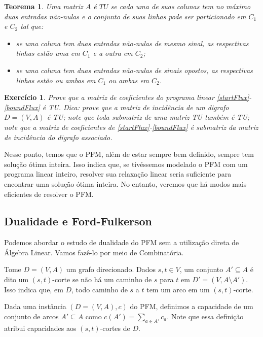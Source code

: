 \documentclass[]{article}
\newtheorem{teorema}{Teorema}
\newtheorem{exercicio}{Exercício}
\numberwithin{equation}{section}
\begin{document}
\begin{teorema}
  Uma matriz $A$ é $TU$ se cada uma de suas colunas tem no máximo duas entradas não-nulas e o conjunto
  de suas linhas pode ser particionado em $C_1$ e $C_2$ tal que:
  \begin{itemize}
    \item se uma coluna tem duas entradas não-nulas de mesmo sinal, as respectivas linhas estão uma em
          $C_1$ e a outra em $C_2$;
    \item se uma coluna tem duas entradas não-nulas de sinais opostos, as respectivas linhas estão ou
          ambas em $C_1$ ou ambas em $C_2$.
  \end{itemize}
\end{teorema}

\begin{exercicio}
  Prove que a matriz de coeficientes do programa linear \eqref{startFlux}-\eqref{boundFlux} é TU.
  Dica: prove que a matriz de incidência de um digrafo $D = (V, A)$ é TU; note que toda submatriz de uma
  matriz TU também é TU; note que a matriz de coeficientes de \eqref{startFlux}-\eqref{boundFlux} é
  submatriz da matriz de incidência do digrafo associado.
\end{exercicio}

Nesse ponto, temos que o PFM, além de estar sempre bem definido, sempre tem solução ótima inteira.
Isso indica que, se tivéssemos modelado o PFM com um programa linear inteiro, resolver sua relaxação
linear seria suficiente para encontrar uma solução ótima inteira.
No entanto, veremos que há modos mais eficientes de resolver o PFM.

\subsection{Dualidade e Ford-Fulkerson}

Podemos abordar o estudo de dualidade do PFM sem a utilização direta de Álgebra Linear.
Vamos fazê-lo por meio de Combinatória.

Tome $D = (V, A)$ um grafo direcionado.
Dados $s, t \in V$, um conjunto $A' \subseteq A$ é dito um $(s, t)$-corte se não há um caminho de $s$
para $t$ em $D' = (V, A \setminus A')$.
Isso indica que, em $D$, todo caminho de $s$ a $t$ tem um arco em um $(s, t)$-corte.

Dada uma instância $(D = (V, A), c)$ do PFM, definimos a capacidade de um conjunto de arcos
$A' \subseteq A$ como $c(A') = \sum_{a \in A'} c_a$.
Note que essa definição atribui capacidades aos $(s, t)$-cortes de $D$.
\end{document}
